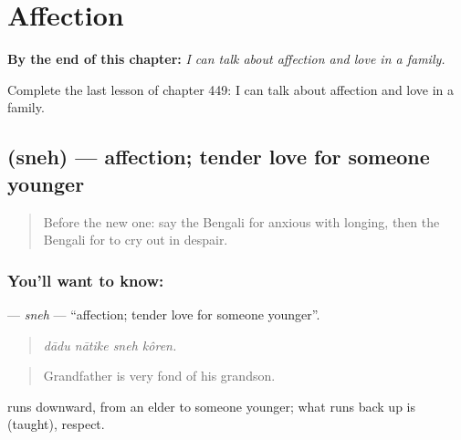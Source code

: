 
\chapter{Affection}
\label{ch:bn-affection}

\begin{chapteropening}
\textbf{By the end of this chapter:} \emph{I can talk about affection and love in a family.}

Complete the last lesson of chapter 449: I can talk about affection and love in a family.
\end{chapteropening}

\section[\texorpdfstring{\bn{স্নেহ} (sneh)}{স্নেহ (sneh)}]{ (sneh) — affection; tender love for someone younger}

\label{lesson:BN-C449-sneh}



\begin{quote}
Before the new one: say the Bengali for anxious with longing, then the Bengali for to cry out in despair.
\end{quote}

\subsection*{You'll want to know: }
\textbf{} — \emph{sneh} — \textquotedblleft{}affection; tender love for someone younger\textquotedblright{}.

\begin{quote}
   
\end{quote}

\begin{quote}
\emph{dādu nātike sneh kôren.}
\end{quote}

\begin{quote}
Grandfather is very fond of his grandson.
\end{quote}

 runs downward, from an elder to someone younger; what runs back up is  (taught), respect.

